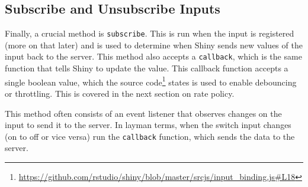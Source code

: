 \documentclass[10pt,]{krantz}
\renewcommand{\href}[2]{#2\footnote{\url{#1}}}
\begin{document}
\hypertarget{shiny-input-sub-unsub}{%
\subsection{Subscribe and Unsubscribe Inputs}\label{shiny-input-sub-unsub}}

Finally, a crucial method is \texttt{subscribe}. This is run when the input is registered (more on that later) and is used to determine when Shiny sends new values of the input back to the server. This method also accepts a \texttt{callback}, which is the same function that tells Shiny to update the value. This callback function accepts a single boolean value, which the \href{https://github.com/rstudio/shiny/blob/master/srcjs/input_binding.js\#L18}{source code} states is used to enable debouncing or throttling. This is covered in the next section on rate policy.

This method often consists of an event listener that observes changes on the input to send it to the server. In layman terms, when the switch input changes (on to off or vice versa) run the \texttt{callback} function, which sends the data to the server.
\end{document}
